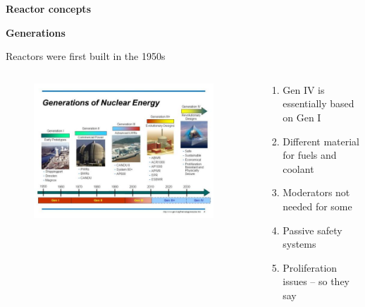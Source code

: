 \documentclass[aspectratio=1610,pdftex,dvipsnames,compress,xcolor={dvipsnames}]{beamer}
\begin{document}
\begin{frame}[plain]{}
    \centering\LARGE\textbf{Reactor concepts}
\end{frame}


\begin{frame}[plain]{}
    \centering\LARGE\textbf{Generations}
\end{frame}


\addtocounter{framenumber}{-2} 
\begin{frame}{Reactors were first built in the 1950s}
    \begin{columns}[t]

        \begin{column}{0.55\textwidth}
            \begin{figure}
                \centering
                \includegraphics[width=0.95\textwidth]{generation.jpg}
            \end{figure}
        \end{column}

        \begin{column}{0.45\textwidth}
            \begin{enumerate}[series=outerlist,topsep=0pt,itemsep=21pt,leftmargin=*,label=(\arabic*)]
                \item[]Gen IV is essentially based on Gen I
                \item[]Different material for fuels and coolant
                \item[]Moderators not needed for some
                \item[]Passive safety systems
                \item[]Proliferation issues -- so they say
            \end{enumerate}
        \end{column}

    \end{columns}
\end{frame}
\end{document}
